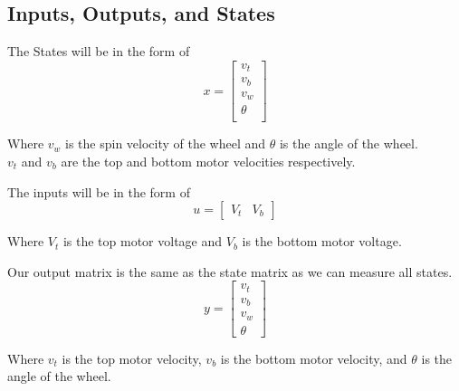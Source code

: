 \documentclass{scrartcl}
\begin{document}
\subsection{Inputs, Outputs, and States}
The States will be in the form of
\begin{equation}
    x =
    \begin{bmatrix}
        v_t    \\
        v_b    \\
        v_w    \\
        \theta \\
    \end{bmatrix}
\end{equation}

Where \(v_w\) is the spin velocity of the wheel and \(\theta\) is the angle of the wheel. \\
\(v_t\) and \(v_b\) are the top and bottom motor velocities respectively.

The inputs will be in the form of
\begin{equation}
    u =
    \begin{bmatrix}
        V_t & V_b
    \end{bmatrix}
\end{equation}

Where \(V_t\) is the top motor voltage and \(V_b\) is the bottom motor voltage.

Our output matrix is the same as the state matrix as we can measure all states.
\begin{equation}
    y =
    \begin{bmatrix}
        v_t \\
        v_b \\
        v_w \\
        \theta
    \end{bmatrix}
\end{equation}

Where \(v_t\) is the top motor velocity, \(v_b\) is the bottom motor velocity, and \(\theta\) is the angle of the wheel.
\end{document}
